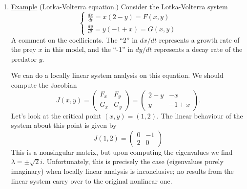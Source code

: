 \documentclass[11pt, letterpaper, oneside]{article}     %
\numberwithin{equation}{subsection}
\theoremstyle{definition}
\numberwithin{theorem}{section}
\theoremstyle{remark}
\begin{document}
\begin{enumerate}
  In general, the $x$- (respectively, $y$-)nullcline is the set of points on which $dx/dt$ (respectively, $dy/dt$) vanishes.

  The critical points are the intersection points of the $x$-nullcline and the $y$-nullcline. They are $(0, 0)$, which represents both species being extinct; $(1,0)$, with species $x$ at carrying capacity and $y$ extinct; $\left(0,\frac{3}{4}\right)$, with species $x$ extinct and $y$ at carrying capacity; and $\left(\frac{1}{2},\frac{1}{2}\right)$, which is the intersection point of the two nontrivial nullclines.

  Drawing the nullclines on a phase diagram splits the domain (in this case the first quadrant of the $xy$-plane) into regions which we can label by the signs of $dx/dt$ and $dy/dt$. Looking at the resulting diagram, we can classify $(1/2,1/2)$ is a stable critical point. In biology it is called a \textbf{coexistence equilibrium}.

  \medskip

\item \underline{Example} (Lotka-Volterra equation.) Consider the Lotka-Volterra system
  \begin{equation}
    \begin{cases}
      \frac{dx}{dt} = x(2-y) = F(x,y)\\
      \frac{dy}{dt} = y(-1 + x) = G(x,y)
    \end{cases}
  \end{equation}
  A comment on the coefficients. The ``2'' in $dx/dt$ represents a growth rate of the prey $x$ in this model, and the ``-1'' in $dy/dt$ represents a decay rate of the predator $y$.

  We can do a locally linear system analysis on this equation. We should compute the Jacobian
  \begin{equation}
    J(x,y) =
    \begin{pmatrix}
      F_x & F_y\\
      G_x & G_y
    \end{pmatrix}
    =
    \begin{pmatrix}
      2-y & -x\\
      y & -1+x
    \end{pmatrix}.
  \end{equation}
  Let's look at the critical point $(x,y) = (1,2)$. The linear behaviour of the system about this point is given by
  \begin{equation}
    J(1,2) =
    \begin{pmatrix}
      0 & -1\\
      2 & 0
    \end{pmatrix}
  \end{equation}
  This is a nonsingular matrix, but upon computing the eigenvalues we find $\lambda = \pm \sqrt{2}i$. Unfortunately, this is precisely the case (eigenvalues purely imaginary) when locally linear analysis is inconclusive; no results from the linear system carry over to the original nonlinear one.


\end{enumerate}
\end{document}
